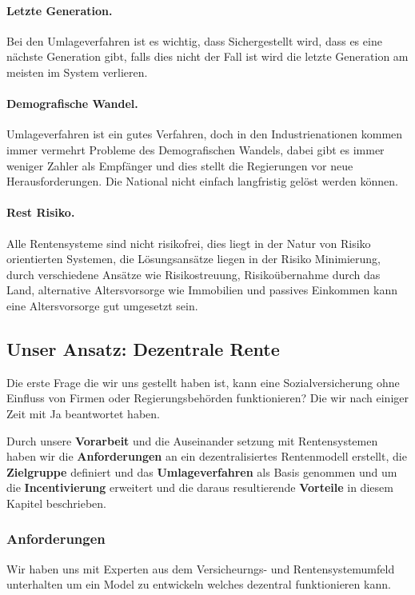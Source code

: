 \paragraph{Letzte Generation.} Bei den Umlageverfahren ist es wichtig, dass Sichergestellt wird, dass es eine nächste Generation gibt, falls dies nicht der Fall ist wird die letzte Generation am meisten im System verlieren.

\paragraph{Demografische Wandel.} Umlageverfahren ist ein gutes Verfahren, doch in den Industrienationen kommen immer vermehrt Probleme des Demografischen Wandels, dabei gibt es immer weniger Zahler als Empfänger und dies stellt die Regierungen vor neue Herausforderungen. Die National nicht einfach langfristig gelöst werden können. 

\paragraph{Rest Risiko.} Alle Rentensysteme sind nicht risikofrei, dies liegt in der Natur von Risiko orientierten Systemen, die Lösungsansätze liegen in der Risiko Minimierung, durch verschiedene Ansätze wie Risikostreuung, Risikoübernahme durch das Land, alternative Altersvorsorge wie Immobilien und passives Einkommen kann eine Altersvorsorge gut umgesetzt sein.


\subsection{Unser Ansatz: Dezentrale Rente}

Die erste Frage die wir uns gestellt haben ist, kann eine Sozialversicherung ohne Einfluss von Firmen oder Regierungsbehörden funktionieren? Die wir nach einiger Zeit mit Ja beantwortet haben.

Durch unsere \textbf{Vorarbeit} und die Auseinander setzung mit Rentensystemen haben wir die \textbf{Anforderungen} an ein dezentralisiertes Rentenmodell erstellt, die  \textbf{Zielgruppe} definiert und das \textbf{Umlageverfahren} als Basis genommen und um die \textbf{Incentivierung} erweitert und die daraus resultierende \textbf{Vorteile} in diesem Kapitel beschrieben.

\subsubsection*{Anforderungen}
Wir haben uns mit Experten aus dem Versicheurngs- und Rentensystemumfeld unterhalten um ein Model zu entwickeln welches dezentral funktionieren kann.

